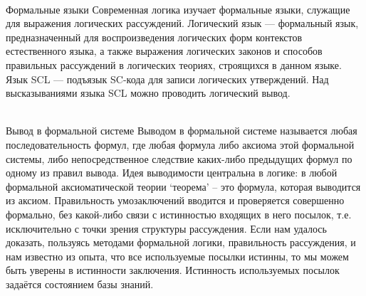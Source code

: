 \begin{frame}{\\Формальные языки}
        Современная логика изучает формальные языки, служащие для выражения логических рассуждений. Логический язык — формальный язык, предназначенный для воспроизведения логических форм контекстов естественного языка, а также выражения логических законов и способов правильных рассуждений в логических теориях, строящихся в данном языке.
        \\Язык SCL — подъязык SC-кода для записи логических утверждений. Над высказываниями языка SCL можно проводить логический вывод.
\end{frame}

\begin{frame}{\\Вывод в формальной системе}
    \vspace{10mm}
        Выводом в формальной системе называется любая последовательность формул, где любая формула либо аксиома этой формальной системы, либо непосредственное следствие каких-либо предыдущих формул по одному из правил вывода. Идея выводимости центральна в логике: в любой формальной аксиоматической теории ‘теорема’ – это формула, которая выводится из аксиом. Правильность умозаключений вводится и проверяется совершенно формально, без какой-либо связи с истинностью входящих в него посылок, т.е. исключительно с точки зрения структуры рассуждения. Если нам удалось доказать, пользуясь методами формальной логики, правильность рассуждения, и нам известно из опыта, что все используемые посылки истинны, то мы можем быть уверены в истинности заключения. Истинность используемых посылок задаётся состоянием базы знаний.
\end{frame}

